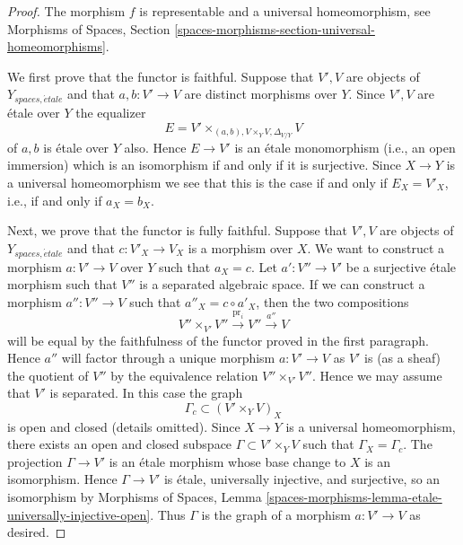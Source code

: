 \begin{proof}
The morphism $f$ is representable and a universal homeomorphism, see
Morphisms of Spaces,
Section \ref{spaces-morphisms-section-universal-homeomorphisms}.

\medskip\noindent
We first prove that the functor is faithful.
Suppose that $V', V$ are objects of $Y_{spaces, \acute{e}tale}$ and
that $a, b : V' \to V$ are distinct morphisms over $Y$.
Since $V', V$ are \'etale over $Y$ the equalizer
$$
E =  V' \times_{(a, b), V \times_Y V, \Delta_{V/Y}} V
$$
of $a, b$ is \'etale over $Y$ also. Hence $E \to V'$ is an \'etale monomorphism
(i.e., an open immersion) which is an isomorphism if and only if it is
surjective. Since $X \to Y$ is a universal homeomorphism we see that this
is the case if and only if $E_X = V'_X$, i.e., if and only if $a_X = b_X$.

\medskip\noindent
Next, we prove that the functor is fully faithful.
Suppose that $V', V$ are objects of $Y_{spaces, \acute{e}tale}$ and
that $c : V'_X \to V_X$ is a morphism over $X$. We want to construct
a morphism $a : V' \to V$ over $Y$ such that $a_X = c$.
Let $a' : V'' \to V'$ be a surjective \'etale morphism such that $V''$ is
a separated algebraic space. If we can construct a morphism
$a'' : V'' \to V$ such that $a''_X = c \circ a'_X$, then the two compositions
$$
V'' \times_{V'} V'' \xrightarrow{\text{pr}_i} V'' \xrightarrow{a''} V
$$
will be equal by the faithfulness of the functor proved in the first
paragraph. Hence $a''$ will factor through a unique morphism
$a : V' \to V$ as $V'$ is (as a sheaf) the quotient of $V''$ by
the equivalence relation $V'' \times_{V'} V''$. Hence we may assume that
$V'$ is separated. In this case the graph
$$
\Gamma_c \subset (V' \times_Y V)_X
$$
is open and closed (details omitted). Since $X \to Y$ is a universal
homeomorphism, there exists an open and closed subspace
$\Gamma \subset V' \times_Y V$ such that $\Gamma_X = \Gamma_c$.
The projection $\Gamma \to V'$ is an \'etale morphism whose base
change to $X$ is an isomorphism. Hence $\Gamma \to V'$ is \'etale,
universally injective, and surjective, so an isomorphism by
Morphisms of Spaces,
Lemma \ref{spaces-morphisms-lemma-etale-universally-injective-open}.
Thus $\Gamma$ is the graph of a morphism $a : V' \to V$ as desired.


\end{proof}
